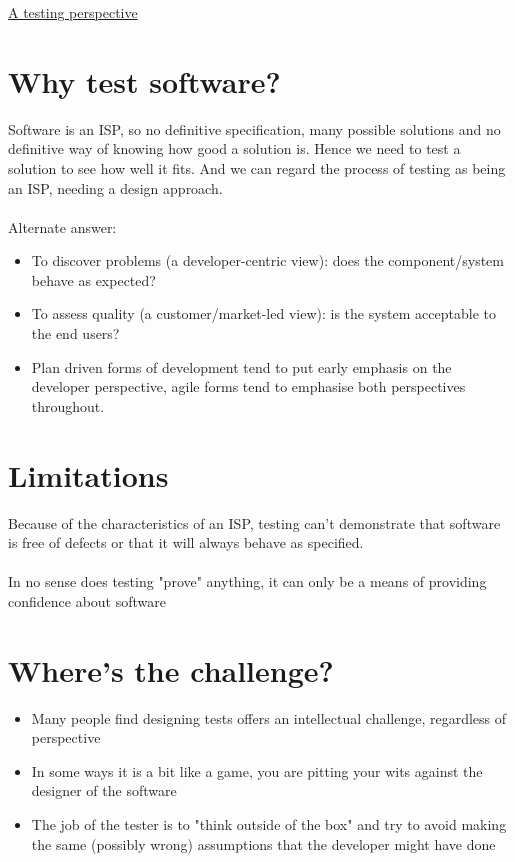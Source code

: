 \documentclass{article}[18pt]
\begin{document}
\begin{center}
\underline{\huge A testing perspective}
\end{center}
\section{Why test software?}
Software is an ISP, so no definitive specification, many possible solutions and no definitive way of knowing how good a solution is. Hence we need to test a solution to see how well it fits. And we can regard the process of testing as being an ISP, needing a design approach.\\
\\
Alternate answer:
\begin{itemize}
	\item To discover problems (a developer-centric view): does the component/system behave as expected?
	\item To assess quality (a customer/market-led view): is the system acceptable to the end users?
	\item Plan driven forms of development tend to put early emphasis on the developer perspective, agile forms tend to emphasise both perspectives throughout.
\end{itemize}
\section{Limitations}
Because of the characteristics of an ISP, testing can't demonstrate that software is free of defects or that it will always behave as specified.\\
\\
In no sense does testing "prove" anything, it can only be a means of providing confidence about software
\section{Where's the challenge?}
\begin{itemize}
	\item Many people find designing tests offers an intellectual challenge, regardless of perspective
	\item In some ways it is a bit like a game, you are pitting your wits against the designer of the software
	\item The job of the tester is to "think outside of the box" and try to avoid making the same (possibly wrong) assumptions that the developer might have done
\end{itemize}
\end{document}
